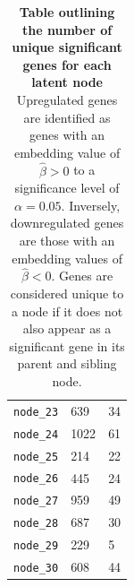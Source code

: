 \begin{table}[]
\begin{tabular}{|p{3cm}||p{4cm}|p{4cm}|}
        \texttt{node\_23} & 639 & 34 \\
        \texttt{node\_24} & 1022 & 61 \\
        \texttt{node\_25} & 214 & 22 \\
        \texttt{node\_26} & 445 & 24 \\
        \texttt{node\_27} & 959 & 49 \\
        \texttt{node\_28} & 687 & 30 \\
        \texttt{node\_29} & 229 & 5 \\
        \texttt{node\_30} & 608 & 44 \\
    \hline
    \end{tabular}
    \caption{\textbf{Table outlining the number of unique significant genes for each latent node} Upregulated genes are identified as genes with an embedding value of $\hat{\beta} > 0$ to a significance level of $\alpha = 0.05$. Inversely, downregulated genes are those with an embedding values of $\hat{\beta} < 0$. Genes are considered unique to a node if it does not also appear as a significant gene in its parent and sibling node.}
    \label{tab:unique_sig_genes}
\end{table}

